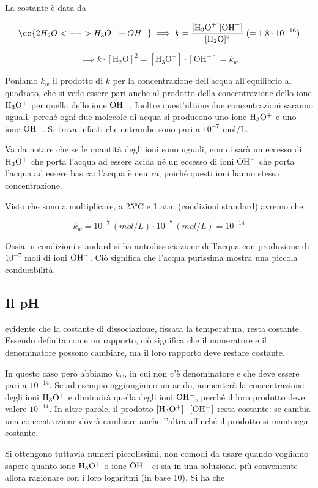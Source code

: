 La costante è data da

$$\ce{2 H_2O <--> H_3O^+ + OH^-}
\implies
k= \frac{[\text{H}_3\text{O}^+] [\text{OH}^-]}{[\text{H}_2\text{O}]^2} \; (=1.8 \cdot 10^{-16})$$

$$\implies k \cdot [\text{H}_2\text{O}]^2 = [\text{H}_3\text{O}^+] \cdot [\text{OH}^-] = k_w$$

Poniamo $k_w$ il prodotto di $k$ per la concentrazione dell'acqua all'equilibrio al quadrato, che si vede essere pari anche al prodotto della concentrazione dello ione $\rm H_3O^+$ per quella dello ione $\rm OH^-$. Inoltre quest'ultime due concentrazioni saranno uguali, perché ogni due molecole di acqua si producono uno ione $\rm H_3O^+$ e uno ione $\rm OH^-$. Si trova infatti che entrambe sono pari a $10^{-7}$ mol/L.

Va da notare che se le quantità degli ioni sono uguali, non ci sarà un eccesso di $\rm H_3O^+$ che porta l'acqua ad essere acida né un eccesso di ioni $\rm OH^-$ che porta l'acqua ad essere basica: l'acqua è neutra, poiché questi ioni hanno stessa concentrazione.

Visto che sono a moltiplicare, a 25°C e 1 atm (condizioni standard) avremo che

$$k_w = 10^{-7} \, (mol/L) \cdot 10^{-7} \, (mol/L) = 10^{-14}$$

Ossia in condizioni standard si ha autodissociazione dell'acqua con produzione di $10^{-7}$ moli di ioni $\rm OH^-$. Ciò significa che l'acqua purissima mostra una piccola conducibilità.

\subsection{Il pH}
\E evidente che la costante di dissociazione, fissata la temperatura, resta costante. Essendo definita come un rapporto, ciò significa che il numeratore e il denominatore possono cambiare, ma il loro rapporto deve restare costante.

In questo caso però abbiamo $k_w$, in cui non c'è denominatore e che deve essere pari a $10^{-14}$. Se ad esempio aggiungiamo un acido, aumenterà la concentrazione degli ioni $\rm H_3O^+$ e diminuirà quella degli ioni $\rm OH^-$, perché il loro prodotto deve valere $10^{-14}$. In altre parole, il prodotto $\rm [H_3O^+] \cdot [OH^-]$ resta costante: se cambia una concentrazione dovrà cambiare anche l'altra affinché il prodotto si mantenga costante.

Si ottengono tuttavia numeri piccolissimi, non comodi da usare quando vogliamo sapere quanto ione $\rm H_3O^+$ o ione $\rm OH^-$ ci sia in una soluzione. \E più conveniente allora ragionare con i loro logaritmi (in base 10). Si ha che

